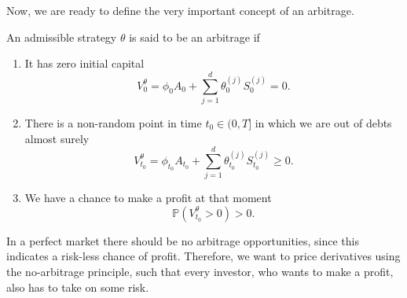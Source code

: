 Now, we are ready to define the very important concept of an arbitrage.
\begin{defn}
    An admissible strategy $\theta$ is said to be an arbitrage if
    \begin{enumerate}
        \item It has zero initial capital
        \begin{equation}
            V_{0}^{\theta}=\phi_{0}A_{0}+\sum_{j=1}^{d}\theta_{0}^{(j)}S_{0}^{(j)}=0.
        \end{equation}
        \item There is a non-random point in time $t_{0}\in (0,T]$ in which we are out of debts almost surely
        \begin{equation}
            V_{t_{0}}^{\theta}=\phi_{t_{0}}A_{t_{0}}+\sum_{j=1}^{d}\theta_{t_{0}}^{(j)}S_{t_{0}}^{(j)}\geq 0.
        \end{equation}
        \item We have a chance to make a profit at that moment
        \begin{equation}
            \mathbb{P}\left(V_{t_{0}}^{\theta}>0\right)>0.
        \end{equation}
    \end{enumerate}
\end{defn}
In a perfect market there should be no arbitrage opportunities, since this indicates a risk-less chance of profit. Therefore, we want to price derivatives using the no-arbitrage principle, such that every investor, who wants to make a profit, also has to take on some risk. 


